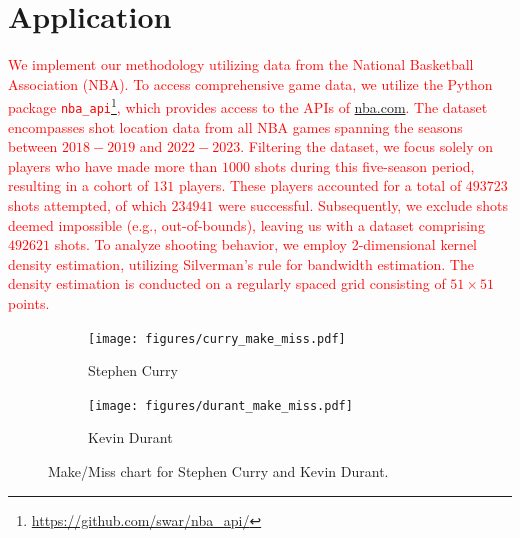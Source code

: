 \section{Application} %
\label{sec:application}

\textcolor{red}{We implement our methodology utilizing data from the National Basketball Association (NBA). To access comprehensive game data, we utilize the Python package \texttt{nba\_api}\footnote{\url{https://github.com/swar/nba_api/}}, which provides access to the APIs of \url{nba.com}. The dataset encompasses shot location data from all NBA games spanning the seasons between $2018-2019$ and $2022-2023$. Filtering the dataset, we focus solely on players who have made more than $1000$ shots during this five-season period, resulting in a cohort of $131$ players. These players accounted for a total of $493723$ shots attempted, of which $234941$ were successful. Subsequently, we exclude shots deemed impossible (e.g., out-of-bounds), leaving us with a dataset comprising $492621$ shots. To analyze shooting behavior, we employ 2-dimensional kernel density estimation, utilizing Silverman's rule \citep{silvermanDensityEstimationStatistics1986} for bandwidth estimation. The density estimation is conducted on a regularly spaced grid consisting of $51 \times 51$ points.}

\begin{figure}
    \centering
    \begin{subfigure}[b]{0.49\textwidth}
        \centering
        \texttt{[image: figures/curry\_make\_miss.pdf]}
        \caption{Stephen Curry}
        \label{fig:curry_make_miss}
    \end{subfigure}
    \hfill
    \begin{subfigure}[b]{0.49\textwidth}
        \centering
        \texttt{[image: figures/durant\_make\_miss.pdf]}
        \caption{Kevin Durant}
        \label{fig:durant_make_miss}
    \end{subfigure}
    \caption{Make/Miss chart for Stephen Curry and Kevin Durant.}
    \label{fig:shoots_make_miss}
\end{figure}


